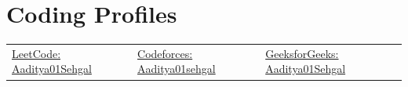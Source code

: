\documentclass[letterpaper,11pt]{article}
\begin{document}
\section{Coding Profiles}
\vspace{-2pt} 
\begin{center}
\begin{tabularx}{\textwidth}{X X X}
\href{https://leetcode.com/u/xoder_xp/}{LeetCode: Aaditya01Sehgal} &
\href{https://codeforces.com/profile/Aaditya01sehgal}{Codeforces: Aaditya01sehgal} &
\href{https://www.geeksforgeeks.org/profile/aadityasesqu9}{GeeksforGeeks: Aaditya01Sehgal} \\
\end{tabularx}
\end{center}
\vspace{-7pt}
\end{document}
